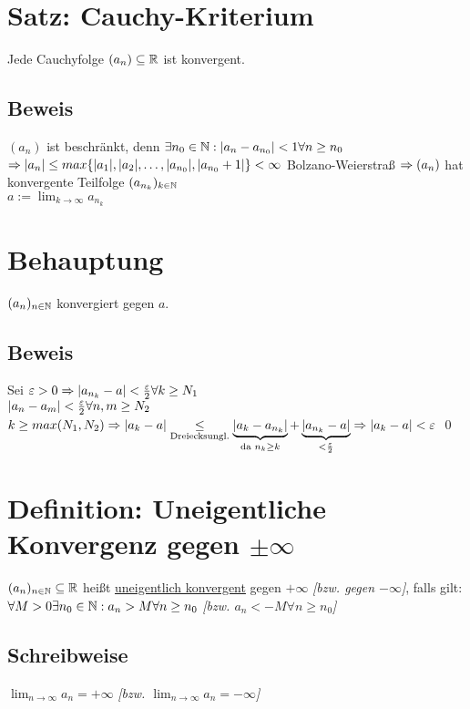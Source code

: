\section{Satz: Cauchy-Kriterium}\label{5.15}
Jede Cauchyfolge $(a_n) \subseteq \mathbb{R}$ ist konvergent.

\subsection*{Beweis}
$(a_n)$ ist beschränkt, denn $\exists n_0 \in \mathbb{N}: |a_n-a_{n_0}| < 1 \forall n \ge n_0$\\
$\Rightarrow |a_n| \le max\{|a_1|,|a_2|,\hdots,|a_{n_0}|,|a_{n_0}+1|\} < \infty$
Bolzano-Weierstraß $\Rightarrow (a_n)$ hat konvergente Teilfolge $(a_{n_k})_{k \in \mathbb{N}}$\\
$a := \lim_{k \to \infty} a_{n_k}$

\section*{Behauptung}
$(a_n)_{n \in \mathbb{N}}$ konvergiert gegen $a$.

\subsection*{Beweis}
Sei $\varepsilon > 0 \Rightarrow |a_{n_k}-a| < \frac{\varepsilon}{2} \forall k \ge N_1$\\
$|a_n-a_m| < \frac{\varepsilon}{2} \forall n,m \ge N_2$\\
$k \ge max(N_1,N_2) \Rightarrow |a_k-a| \underset{\text{Dreiecksungl.}}{\le} \underbrace{|a_k-a_{n_k}|}_{\text{da } n_k \ge k} + \underbrace{|a_{n_k}-a|}_{< \frac{\varepsilon}{2}} \Rightarrow |a_k-a| < \varepsilon$ \qed

\section{\texorpdfstring{Definition: Uneigentliche Konvergenz gegen $\pm \infty$}{Definition: Uneigentliche Konvergenz gegen \textbackslash{pm} \textbackslash{infty}}}\label{5.16}
$(a_n)_{n \in \mathbb{N}} \subseteq \mathbb{R}$ heißt \underline{uneigentlich konvergent} gegen $+\infty$ \emph{[bzw. gegen $-\infty$]}, falls gilt:\\
$\forall M > 0 \exists n_0 \in \mathbb{N}: a_n > M \forall n \ge n_0$ \emph{[bzw. $a_n < -M \forall n \ge n_0$]}

\subsection*{Schreibweise}
$\lim_{n \to \infty} a_n = +\infty$ \emph{[bzw. $\lim_{n \to \infty} a_n = -\infty$]}

